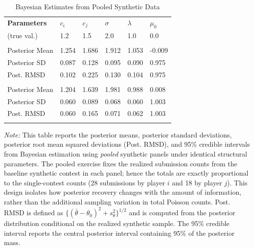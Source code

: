 \documentclass[mnsc]{informs3}
\begin{document}
\begin{table}[htbp]
\centering
\caption{Bayesian Estimates from Pooled Synthetic Data}\label{tbl-pool-synthetic-data}
\begin{tabularx}{\textwidth}{lYYYYY}
\toprule
\textbf{Parameters} & \textbf{$c_i$} & \textbf{$c_j$} & \textbf{$\sigma$} & \textbf{$\lambda$} & \textbf{$\mu_0$}\\
\addlinespace[0.25ex]
\addlinespace[0.25ex]
(true val.)        & 1.2 & 1.5 & 2.0 & 1.0 & 0.0\\
\midrule
\addlinespace
{} \\
Posterior Mean  & 1.254 & 1.686 & 1.912 & 1.053 & -0.009\\
Posterior SD     & 0.087 & 0.128 & 0.095 & 0.090 & 0.975\\
Post. RMSD          & 0.102 & 0.225 & 0.130 & 0.104 & 0.975\\
\addlinespace
{} \\
Posterior Mean  & 1.204 & 1.639 & 1.981 & 0.988 & 0.008\\
Posterior SD     & 0.060 & 0.089 & 0.068 & 0.060 & 1.003\\
Post. RMSD          & 0.060 & 0.165 & 0.071 & 0.062 & 1.003\\
\bottomrule
\addlinespace[0.5ex]
\end{tabularx}
\begin{minipage}{\textwidth}
{\footnotesize
\textit{Note:}
This table reports the posterior means, posterior standard deviations, posterior root mean squared deviations (Post. RMSD), and 95\% credible intervals from Bayesian estimation using \textit{pooled} synthetic panels under identical structural parameters. The pooled exercise fixes the realized submission counts from the baseline synthetic contest in each panel; hence the totals are exactly proportional to the single-contest counts (28 submissions by player $i$ and 18 by player $j$). This design isolates how posterior recovery changes with the amount of information, rather than the additional sampling variation in total Poisson counts.
Post. RMSD is defined as $\{(\bar{\theta}-\theta_0)^2+s_\theta^2\}^{1/2}$ and is computed from the posterior distribution conditional on the realized synthetic sample.
The 95\% credible interval reports the central posterior interval containing 95\% of the posterior mass.
}
\end{minipage}
\end{table}
\end{document}
